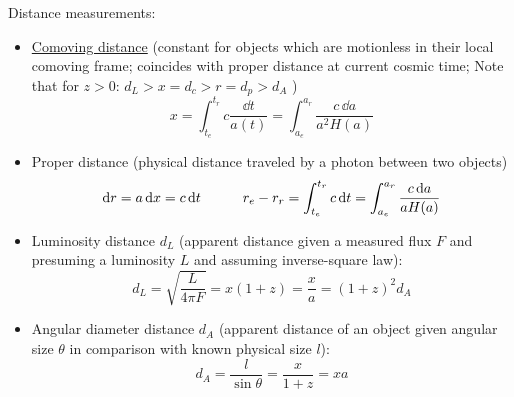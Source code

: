 		\noindent
		Distance measurements:
		\begin{itemize}
			\item \href{https://en.wikipedia.org/wiki/Comoving_and_proper_distances}{Comoving distance} (constant for objects which are motionless in their local comoving frame; coincides with proper distance at current cosmic time; Note that for $z>0$: $d_L > x = d_c > r = d_p > d_A$ )
				\begin{equation}
					x = \int_{t_e}^{t_r} c\frac{\dd t}{a(t)}
					= \int_{a_e}^{a_r} \frac{c \, \dd a}{a^2 H(a)}
				\end{equation}
			\item Proper distance (physical distance traveled by a photon between two objects)
				\begin{equation}
					\dd r = a \,\dd x = c \, \dd t
					\hspace{30pt}
					r_e - r_r = \int_{t_e}^{t_r} c \,\dd t
					= \int_{a_e}^{a_r} \frac{c\, \dd a}{a H(a)}
				\end{equation}
			\item Luminosity distance $d_L$ (apparent distance given a measured flux $F$ and presuming a luminosity $L$ and assuming inverse-square law):
				\begin{equation}
					d_L = \sqrt{\frac{L}{4 \pi F}} = x (1+z) = \frac{x}{a} = (1+z)^2 d_A
				\end{equation}
			\item Angular diameter distance $d_A$ (apparent distance of an object given angular size $\theta$ in comparison with known physical size $l$):
				\begin{equation}
					d_A = \frac{l}{\sin \theta} = \frac{x}{1+z} = x a
				\end{equation}
		\end{itemize}


